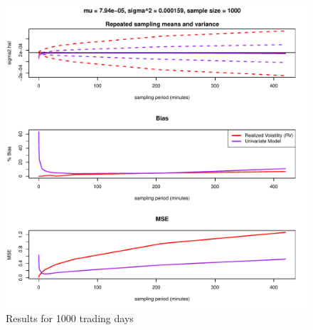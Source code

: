 \begin{figure}
	\centering
	\includegraphics[scale=0.8]{results-7-14-13-5-53.pdf}
	\caption{Results for 1000 trading days}
	\label{fig:estimator-comparison-no-microstructure}
\end{figure}

